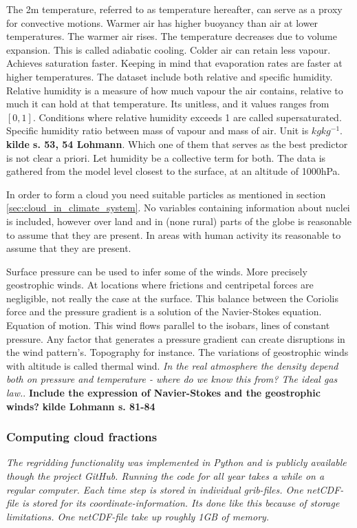 The 2m temperature, referred to as temperature hereafter, can serve as a proxy for convective motions. Warmer air has higher buoyancy than air at lower temperatures. The warmer air rises. The temperature decreases due to volume expansion. This is called adiabatic cooling. Colder air can retain less vapour. Achieves saturation faster. Keeping in mind that evaporation rates are faster at higher temperatures. The dataset include both relative and specific humidity. Relative humidity is a measure of how much vapour the air contains, relative to much it can hold at that temperature. Its unitless, and it values ranges from $\left[ 0, 1 \right]$.  Conditions where relative humidity exceeds 1 are called supersaturated. Specific humidity ratio between mass of vapour and mass of air. Unit is $kg kg^{-1}$. \textbf{kilde s. 53, 54 Lohmann}. Which one of them that serves as the best predictor is not clear a priori. Let humidity be a collective term for both. The data is gathered from the model level closest to the surface, at an altitude of 1000hPa. 
 
In order to form a cloud you need suitable particles as mentioned in section \ref{sec:cloud_in_climate_system}. No variables containing information about nuclei is included, however over land and in (none rural) parts of the globe is reasonable to assume that they are present. In areas with human activity its reasonable to assume that they are present.

Surface pressure can be used to infer some of the winds. More precisely geostrophic winds. At locations where frictions and centripetal forces are negligible, not really the case at the surface. This balance between the Coriolis force and the pressure gradient is a solution of the Navier-Stokes equation. Equation of motion. This wind flows parallel to the isobars, lines of constant pressure. Any factor that generates a pressure gradient can create disruptions in the wind pattern's. Topography for instance. The variations of geostrophic winds with altitude is called thermal wind. \textit{In the real atmosphere the density depend both on pressure and temperature - where do we know this from? The ideal gas law.}. \textbf{Include the expression of Navier-Stokes and the geostrophic winds?}
\textbf{kilde Lohmann s. 81-84}

\subsubsection{Computing cloud fractions} \label{sec:remapping}
\textit{The regridding functionality was implemented in Python and is publicly available though the project GitHub. Running the code for all year takes a while on a regular computer. Each time step is stored in individual grib-files. One netCDF-file is stored for its coordinate-information. Its done like this because of storage limitations. One netCDF-file take up roughly 1GB of memory. }

